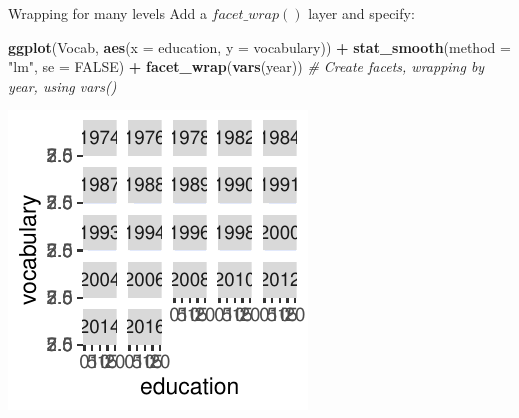 \documentclass[
  ignorenonframetext,
]{beamer}
\newenvironment{Shaded}{\begin{snugshade}}{\end{snugshade}}
\newcommand{\AttributeTok}[1]{\textcolor[rgb]{0.13,0.29,0.53}{#1}}
\newcommand{\CommentTok}[1]{\textcolor[rgb]{0.56,0.35,0.01}{\textit{#1}}}
\newcommand{\ConstantTok}[1]{\textcolor[rgb]{0.56,0.35,0.01}{#1}}
\newcommand{\FunctionTok}[1]{\textcolor[rgb]{0.13,0.29,0.53}{\textbf{#1}}}
\newcommand{\NormalTok}[1]{#1}
\newcommand{\SpecialCharTok}[1]{\textcolor[rgb]{0.81,0.36,0.00}{\textbf{#1}}}
\newcommand{\StringTok}[1]{\textcolor[rgb]{0.31,0.60,0.02}{#1}}
\begin{document}
\begin{frame}[fragile]{Wrapping for many levels}
\label{wrapping-for-many-levels-5}
Add a \(facet\_wrap()\) layer and specify:


\begin{Shaded}
\begin{Highlighting}[]
\FunctionTok{ggplot}\NormalTok{(Vocab, }\FunctionTok{aes}\NormalTok{(}\AttributeTok{x =}\NormalTok{ education, }\AttributeTok{y =}\NormalTok{ vocabulary)) }\SpecialCharTok{+} \FunctionTok{stat\_smooth}\NormalTok{(}\AttributeTok{method =} \StringTok{"lm"}\NormalTok{,}
    \AttributeTok{se =} \ConstantTok{FALSE}\NormalTok{) }\SpecialCharTok{+} \FunctionTok{facet\_wrap}\NormalTok{(}\FunctionTok{vars}\NormalTok{(year))  }\CommentTok{\# Create facets, wrapping by year, using vars()}
\end{Highlighting}
\end{Shaded}

\begin{center}\includegraphics[width=0.5\linewidth]{Figs/unnamed-chunk-95-1} \end{center}
\end{frame}
\end{document}
